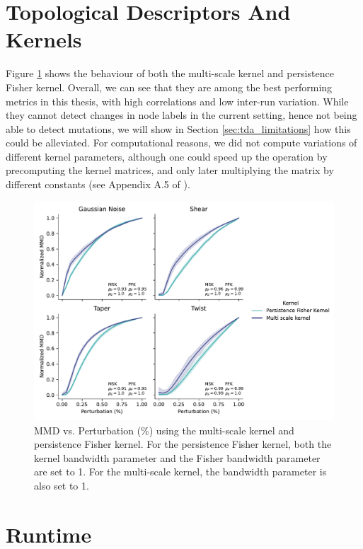 \section{Topological Descriptors And Kernels}\label{sec:results_topo_kernels}

Figure \ref{fig:tda_kernels} shows the behaviour of both the multi-scale kernel
and persistence Fisher kernel. Overall, we can see that they are among the best
performing metrics in this thesis, with high correlations and low inter-run
variation. While they cannot detect changes in node labels in the current
setting, hence not being able to detect mutations, we will show in Section
\ref{sec:tda_limitations} how this could be alleviated. For computational
reasons, we did not compute variations of different kernel parameters, although
one could speed up the operation by precomputing the kernel matrices, and only
later multiplying the matrix by different constants (see Appendix A.5 of
\citep{o2021evaluation}).

\begin{figure}
  \centering
  \includegraphics[width=\textwidth]{./figures/results/res_6.pdf}
  \caption[MMD vs. Perturbation (\%) using the multi-scale kernel and
  persistence Fisher kernel.]{MMD vs. Perturbation (\%) using the multi-scale
kernel and persistence Fisher kernel. For the persistence Fisher kernel, both
the kernel bandwidth parameter and the Fisher bandwidth parameter are set to 1.
For the multi-scale kernel, the bandwidth parameter is also set to 1.}
  \label{fig:tda_kernels}
\end{figure}


\section{Runtime}\label{sec:results_runtime}


